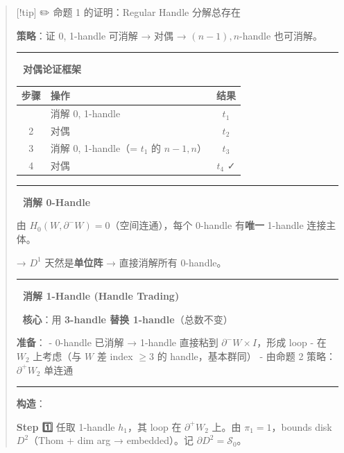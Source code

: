 \documentclass[
  letterpaper,
  DIV=11,
  numbers=noendperiod]{scrartcl}
\begin{document}
\begin{quote}
{[}!tip{]} ✏️ 命题 1 的证明：Regular Handle 分解总存在

\textbf{策略}：证 0, 1-handle 可消解 → 对偶 → \((n-1), n\)-handle
也可消解。

\begin{center}\rule{0.5\linewidth}{0.5pt}\end{center}

\textbf{🔄 对偶论证框架}

\begin{longtable}[]{@{}clc@{}}
\toprule\noalign{}
步骤 & 操作 & 结果 \\
\midrule\noalign{}
\endhead
\bottomrule\noalign{}
\endlastfoot
1 & 消解 0, 1-handle & \(t_1\) \\
2 & 对偶 & \(t_2\) \\
3 & 消解 0, 1-handle（= \(t_1\) 的 \(n{-}1, n\)） & \(t_3\) \\
4 & 对偶 & \(t_4\) ✓ \\
\end{longtable}

\begin{center}\rule{0.5\linewidth}{0.5pt}\end{center}

\textbf{🔹 消解 0-Handle}

由 \(H_0(W, \partial^- W) = 0\)（空间连通），每个 0-handle
有\textbf{唯一} 1-handle 连接主体。

→ \(D^1\) 天然是\textbf{单位阵} → 直接消解所有 0-handle。

\begin{center}\rule{0.5\linewidth}{0.5pt}\end{center}

\textbf{🔹 消解 1-Handle (Handle Trading)}

🔑 \textbf{核心}：用 \textbf{3-handle 替换 1-handle}（总数不变）

\textbf{准备}： - 0-handle 已消解 → 1-handle 直接粘到
\(\partial^- W \times I\)，形成 loop - 在 \(W_2\) 上考虑（与 \(W\) 差
index \(\geq 3\) 的 handle，基本群同） - 由命题 2
策略：\(\partial^+ W_2\) 单连通

\begin{center}\rule{0.5\linewidth}{0.5pt}\end{center}

\textbf{构造}：

\textbf{Step 1️⃣} 任取 1-handle \(h_1\)，其 loop 在 \(\partial^+ W_2\)
上。由 \(\pi_1 = 1\)，bounds disk \(D^2\)（Thom + dim arg →
embedded）。记 \(\partial D^2 = \mathscr{S}_0\)。


\end{quote}
\end{document}
